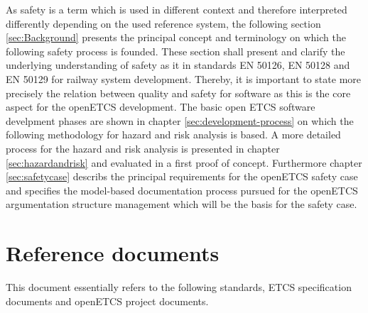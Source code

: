 \documentclass{template/openetcs_report}
\begin{document}
As safety is a term which is used in different context and therefore interpreted differently depending on the used reference system, the following section \ref{sec:Background} presents the principal concept and terminology on which the following safety process is founded. These section shall present and clarify the underlying understanding of safety as it in standards EN 50126, EN 50128 and EN 50129 for railway system development. Thereby, it is important to state more precisely the relation between quality and safety for software as this is the core aspect for the openETCS development. The basic open ETCS software develpment phases are shown in chapter \ref{sec:development-process} on which the following methodology for hazard and risk analysis is based. A more detailed process for the hazard and risk analysis is presented in chapter \ref{sec:hazardandrisk}  and evaluated in a first proof of concept. Furthermore chapter \ref{sec:safetycase} describs the principal requirements for the openETCS safety case and specifies the model-based documentation process pursued for the openETCS argumentation structure management which will be the basis for the safety case. 



\section{Reference documents}
\label{sec:refdoc}

This document essentially refers to the following standards, ETCS specification documents and openETCS project documents.
\end{document}
